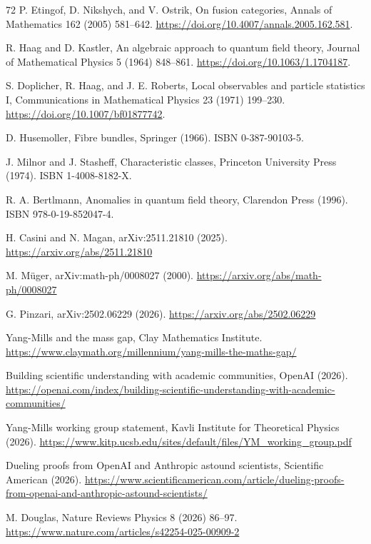 \documentclass[11pt,letterpaper]{article}
\theoremstyle{definition}
\begin{document}
\begin{thebibliography}{72}
 P. Etingof, D. Nikshych, and V. Ostrik, On fusion categories, Annals of Mathematics 162 (2005) 581--642. \url{https://doi.org/10.4007/annals.2005.162.581}.

 R. Haag and D. Kastler, An algebraic approach to quantum field theory, Journal of Mathematical Physics 5 (1964) 848--861. \url{https://doi.org/10.1063/1.1704187}.

 S. Doplicher, R. Haag, and J. E. Roberts, Local observables and particle statistics I, Communications in Mathematical Physics 23 (1971) 199--230. \url{https://doi.org/10.1007/bf01877742}.

 D. Husemoller, Fibre bundles, Springer (1966). ISBN 0-387-90103-5.

 J. Milnor and J. Stasheff, Characteristic classes, Princeton University Press (1974). ISBN 1-4008-8182-X.

 R. A. Bertlmann, Anomalies in quantum field theory, Clarendon Press (1996). ISBN 978-0-19-852047-4.

 H. Casini and N. Magan, arXiv:2511.21810 (2025). \url{https://arxiv.org/abs/2511.21810}

 M. M\"uger, arXiv:math-ph/0008027 (2000). \url{https://arxiv.org/abs/math-ph/0008027}

 G. Pinzari, arXiv:2502.06229 (2026). \url{https://arxiv.org/abs/2502.06229}

 Yang-Mills and the mass gap, Clay Mathematics Institute. \url{https://www.claymath.org/millennium/yang-mills-the-maths-gap/}

 Building scientific understanding with academic communities, OpenAI (2026). \url{https://openai.com/index/building-scientific-understanding-with-academic-communities/}

 Yang-Mills working group statement, Kavli Institute for Theoretical Physics (2026). \url{https://www.kitp.ucsb.edu/sites/default/files/YM_working_group.pdf}

 Dueling proofs from OpenAI and Anthropic astound scientists, Scientific American (2026). \url{https://www.scientificamerican.com/article/dueling-proofs-from-openai-and-anthropic-astound-scientists/}

 M. Douglas, Nature Reviews Physics 8 (2026) 86--97. \url{https://www.nature.com/articles/s42254-025-00909-2}


\end{thebibliography}
\end{document}
